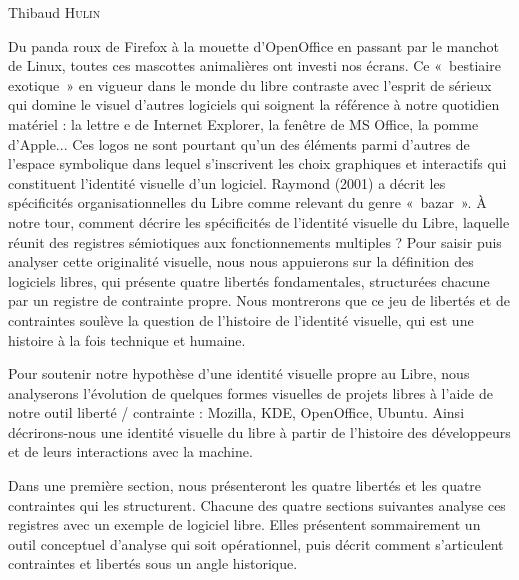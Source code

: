 \documentclass{FramateX}
\begin{document}
\begin{refsection}

\begin{flushright}
Thibaud \textsc{Hulin}
\end{flushright}
\vspace{10 mm}



Du panda roux de Firefox à la mouette d'OpenOffice en passant par le
manchot de Linux, toutes ces mascottes animalières ont investi nos
écrans. Ce «~bestiaire exotique~» en vigueur dans le monde du libre
contraste avec l'esprit de sérieux qui domine le visuel d'autres
logiciels qui soignent la référence à notre quotidien matériel : la
lettre e de Internet Explorer, la fenêtre de MS Office, la pomme
d'Apple... Ces logos ne sont pourtant qu'un des éléments parmi d'autres
de l'espace symbolique dans lequel s'inscrivent les choix graphiques et
interactifs qui constituent l'identité visuelle d'un logiciel. Raymond
(2001) a décrit les spécificités organisationnelles du Libre comme
relevant du genre «~bazar~». À notre tour, comment décrire les
spécificités de l'identité visuelle du Libre, laquelle réunit des
registres sémiotiques aux fonctionnements multiples ? Pour saisir puis
analyser cette originalité visuelle, nous nous appuierons sur la
définition des logiciels libres, qui présente quatre libertés
fondamentales, structurées chacune par un registre de contrainte
propre. Nous montrerons que ce jeu de libertés et de contraintes
soulève la question de l'histoire de l'identité visuelle, qui est une
histoire à la fois technique et humaine. 

Pour soutenir notre hypothèse d'une identité visuelle propre au Libre,
nous analyserons l'évolution de quelques formes visuelles de projets
libres à l'aide de notre outil liberté / contrainte : Mozilla, KDE,
OpenOffice, Ubuntu. Ainsi décrirons-nous une identité visuelle du libre
à partir de l'histoire des développeurs et de leurs interactions avec
la machine. 

Dans une première section, nous présenteront les quatre libertés et les
quatre contraintes qui les structurent. Chacune des quatre sections
suivantes analyse ces registres avec un exemple de logiciel libre.
Elles présentent sommairement un outil conceptuel d'analyse qui soit
opérationnel, puis décrit comment s'articulent contraintes et libertés
sous un angle historique.


\end{refsection}
\end{document}
